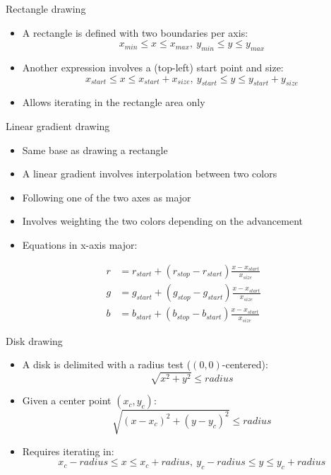 \begin{frame}{Rectangle drawing}
  \begin{itemize}
  \item A rectangle is defined with two boundaries per axis:
\[
x_{min} \leq x \leq x_{max},~ y_{min} \leq y \leq y_{max}
\]
  \item Another expression involves a (top-left) start point and size:
\[
x_{start} \leq x \leq x_{start} + x_{size},~ y_{start} \leq y \leq y_{start} + y_{size}
\]
  \item Allows iterating in the rectangle area only
  \end{itemize}
\end{frame}

\begin{frame}{Linear gradient drawing}
  \begin{itemize}
  \item Same base as drawing a rectangle
  \item A linear gradient involves interpolation between two colors
  \item Following one of the two axes as major
  \item Involves weighting the two colors depending on the advancement
  \item Equations in x-axis major:
  \end{itemize}
\begin{align*}
r &= r_{start} + (r_{stop} - r_{start}) \frac{x - x_{start}}{x_{size}}\\
g &= g_{start} + (g_{stop} - g_{start}) \frac{x - x_{start}}{x_{size}}\\
b &= b_{start} + (b_{stop} - b_{start}) \frac{x - x_{start}}{x_{size}}
\end{align*}
\end{frame}

\begin{frame}{Disk drawing}
  \begin{itemize}
  \item A disk is delimited with a radius test (\((0,0)\)-centered):
\[
\sqrt{x^2 + y^2} \leq radius
\]
  \item Given a center point \((x_c,y_c)\):
\[
\sqrt{(x - x_c)^2 + (y - y_c)^2} \leq radius
\]
  \item Requires iterating in:
\[
x_c - radius \leq x \leq x_c + radius,~ y_c - radius \leq y \leq y_c + radius
\]
  \end{itemize}
\end{frame}

